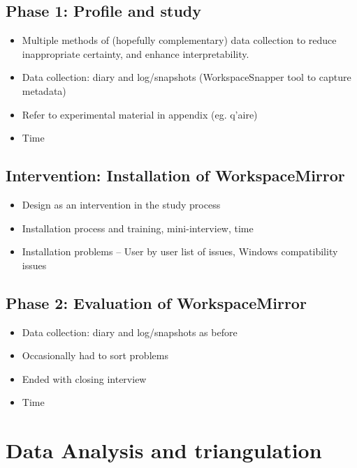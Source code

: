 \subsection{Phase 1: Profile and study}
\begin{itemize}
	\item Multiple methods of (hopefully complementary) data collection to reduce inappropriate certainty, and enhance interpretability.
	\item Data collection: diary and log/snapshots (WorkspaceSnapper tool to capture metadata)
	\item Refer to experimental material in appendix (eg. q'aire)
	\item Time
\end{itemize}

\subsection{Intervention: Installation of WorkspaceMirror}
\begin{itemize}
	\item Design as an intervention in the study process
	\item Installation process and training, mini-interview, time
	\item Installation problems -- User by user list of issues, Windows compatibility issues
\end{itemize}

\subsection{Phase 2: Evaluation of WorkspaceMirror}
\begin{itemize}
	\item Data collection: diary and log/snapshots as before
	\item Occasionally had to sort problems
	\item Ended with closing interview
	\item Time
\end{itemize}

\section{Data Analysis and triangulation}


